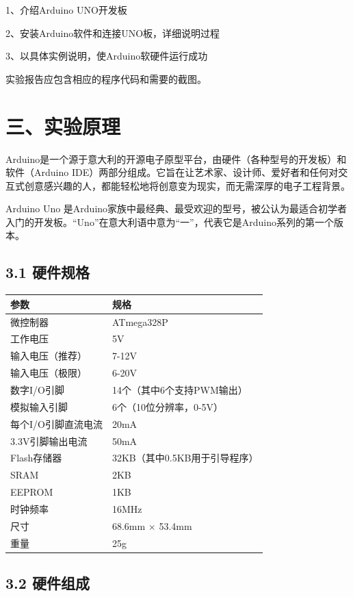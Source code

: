 \documentclass[12pt,a4paper]{article}
\begin{document}
1、介绍Arduino UNO开发板

2、安装Arduino软件和连接UNO板，详细说明过程

3、以具体实例说明，使Arduino软硬件运行成功

实验报告应包含相应的程序代码和需要的截图。

\section*{三、实验原理}

Arduino是一个源于意大利的开源电子原型平台，由硬件（各种型号的开发板）和软件（Arduino IDE）两部分组成。它旨在让艺术家、设计师、爱好者和任何对交互式创意感兴趣的人，都能轻松地将创意变为现实，而无需深厚的电子工程背景。

Arduino Uno 是Arduino家族中最经典、最受欢迎的型号，被公认为最适合初学者入门的开发板。“Uno”在意大利语中意为“一”，代表它是Arduino系列的第一个版本。

\subsection*{3.1 硬件规格}

\begin{tabularx}{\textwidth}{|l|X|}
\hline
\textbf{参数} & \textbf{规格} \\
\hline
微控制器 & ATmega328P \\
\hline
工作电压 & 5V \\
\hline
输入电压（推荐） & 7-12V \\
\hline
输入电压（极限） & 6-20V \\
\hline
数字I/O引脚 & 14个（其中6个支持PWM输出） \\
\hline
模拟输入引脚 & 6个（10位分辨率，0-5V） \\
\hline
每个I/O引脚直流电流 & 20mA \\
\hline
3.3V引脚输出电流 & 50mA \\
\hline
Flash存储器 & 32KB（其中0.5KB用于引导程序） \\
\hline
SRAM & 2KB \\
\hline
EEPROM & 1KB \\
\hline
时钟频率 & 16MHz \\
\hline
尺寸 & 68.6mm × 53.4mm \\
\hline
重量 & 25g \\
\hline
\end{tabularx}

\subsection*{3.2 硬件组成}
\end{document}
